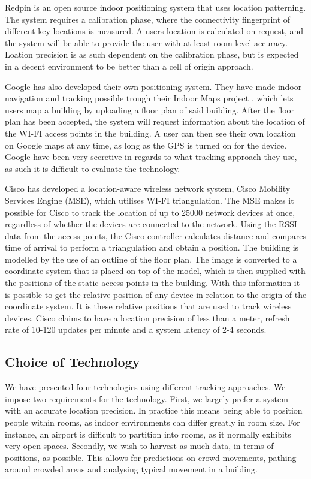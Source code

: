 Redpin is an open source indoor positioning system that uses location patterning. The system requires a calibration phase, where the connectivity fingerprint of different key locations is measured. A users location is calculated on request, and the system will be able to provide the user with at least room-level accuracy\cite{redpin}. Loation precision is as such dependent on the calibration phase, but is expected in a decent environment to be better than a cell of origin approach. 

Google has also developed their own positioning system. They have made indoor navigation and tracking possible trough their Indoor Maps project \cite{IPSoverGPS}, which lets users map a building by uploading a floor plan of said building. After the floor plan has been accepted, the system will request information about the location of the WI-FI access points in the building\cite{googleindoormaps}. A user can then see their own location on Google maps at any time, as long as the GPS is turned on for the device. Google have been very secretive in regards to what tracking approach they use, as such it is difficult to evaluate the technology.

Cisco has developed a location-aware wireless network system, Cisco Mobility Services Engine (MSE), which utilises WI-FI triangulation\cite{CiscoTri}. The MSE makes it possible for Cisco to track the location of up to 25000 network devices at once, regardless of whether the devices are connected to the network. Using the RSSI data from the access points, the Cisco controller calculates distance and compares time of arrival to perform a triangulation and obtain a position\cite{ciscoMSE}.
The building is modelled by the use of an outline of the floor plan. The image is converted to a coordinate system that is placed on top of the model, which is then supplied with the positions of the static access points in the building. With this information it is possible to get the relative position of any device in relation to the origin of the coordinate system. It is these relative positions that are used to track wireless devices.
Cisco claims to have a location precision of less than a meter, refresh rate of 10-120 updates per minute and a system latency of 2-4 seconds\cite{dimensions}. 

\subsection{Choice of Technology}\label{subsec:cisco}
We have presented four technologies using different tracking approaches. We impose two requirements for the technology. First, we largely prefer a system with an accurate location precision. In practice this means being able to position people within rooms, as indoor environments can differ greatly in room size. For instance, an airport is difficult to partition into rooms, as it normally exhibits very open spaces. Secondly, we wish to harvest as much data, in terms of positions, as possible. This allows for predictions on crowd movements, pathing around crowded areas and analysing typical movement in a building. 

